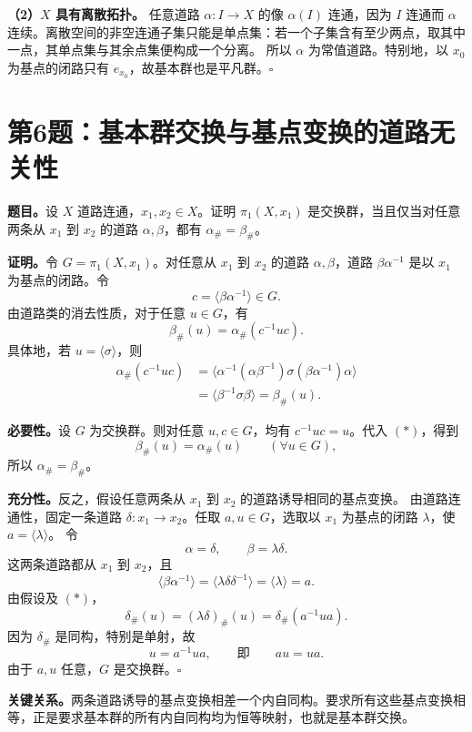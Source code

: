 \documentclass[UTF8,11pt,a4paper]{ctexart}
\newcommand{\pc}[1]{\langle #1\rangle}
\newcommand{\pf}{\par\noindent\textbf{证明。}}
\newcommand{\done}{\hfill\(\square\)\par}
\begin{document}
\textbf{（2）\(X\) 具有离散拓扑。}
任意道路 \(\alpha:I\to X\) 的像 \(\alpha(I)\) 连通，因为 \(I\) 连通而 \(\alpha\) 连续。离散空间的非空连通子集只能是单点集：若一个子集含有至少两点，取其中一点，其单点集与其余点集便构成一个分离。
所以 \(\alpha\) 为常值道路。特别地，以 \(x_0\) 为基点的闭路只有 \(e_{x_0}\)，故基本群也是平凡群。\done

\clearpage
\section*{第6题：基本群交换与基点变换的道路无关性}
\textbf{题目。}设 \(X\) 道路连通，\(x_1,x_2\in X\)。证明 \(\pi_1(X,x_1)\) 是交换群，当且仅当对任意两条从 \(x_1\) 到 \(x_2\) 的道路 \(\alpha,\beta\)，都有 \(\alpha_\#=\beta_\#\)。

\pf 令 \(G=\pi_1(X,x_1)\)。对任意从 \(x_1\) 到 \(x_2\) 的道路 \(\alpha,\beta\)，道路 \(\beta\alpha^{-1}\) 是以 \(x_1\) 为基点的闭路。令
\[
 c=\pc{\beta\alpha^{-1}}\in G.
\]
由道路类的消去性质，对于任意 \(u\in G\)，有
\begin{equation}
 \beta_\#(u)=\alpha_\#(c^{-1}uc).
 \tag{$*$}
\end{equation}
具体地，若 \(u=\pc{\sigma}\)，则
\[
\begin{aligned}
 \alpha_\#(c^{-1}uc)
 &=\pc{\alpha^{-1}(\alpha\beta^{-1})\sigma
                 (\beta\alpha^{-1})\alpha}\\
 &=\pc{\beta^{-1}\sigma\beta}
 =\beta_\#(u).
\end{aligned}
\]

\textbf{必要性。}设 \(G\) 为交换群。则对任意 \(u,c\in G\)，均有 \(c^{-1}uc=u\)。代入 \((*)\)，得到
\[
 \beta_\#(u)=\alpha_\#(u)\qquad(\forall u\in G),
\]
所以 \(\alpha_\#=\beta_\#\)。

\textbf{充分性。}反之，假设任意两条从 \(x_1\) 到 \(x_2\) 的道路诱导相同的基点变换。
由道路连通性，固定一条道路 \(\delta:x_1\to x_2\)。任取 \(a,u\in G\)，选取以 \(x_1\) 为基点的闭路 \(\lambda\)，使 \(a=\pc{\lambda}\)。
令
\[
 \alpha=\delta,\qquad \beta=\lambda\delta.
\]
这两条道路都从 \(x_1\) 到 \(x_2\)，且
\[
 \pc{\beta\alpha^{-1}}
 =\pc{\lambda\delta\delta^{-1}}
 =\pc{\lambda}=a.
\]
由假设及 \((*)\)，
\[
 \delta_\#(u)=(\lambda\delta)_\#(u)
             =\delta_\#(a^{-1}ua).
\]
因为 \(\delta_\#\) 是同构，特别是单射，故
\[
 u=a^{-1}ua,
 \qquad\text{即}\qquad au=ua.
\]
由于 \(a,u\) 任意，\(G\) 是交换群。\done

\noindent\textbf{关键关系。}两条道路诱导的基点变换相差一个内自同构。要求所有这些基点变换相等，正是要求基本群的所有内自同构均为恒等映射，也就是基本群交换。
\end{document}
